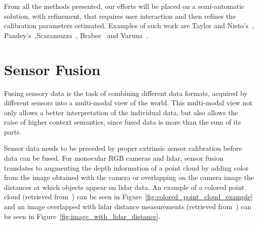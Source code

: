 From all the methods presented, our efforts will be placed on a semi-automatic solution, with refinement, that requires user interaction and then refines the calibration parameters estimated. Examples of such work are Taylor and Nieto's~\cite{Taylor2013}, Pandey's~\cite{Pandey2012},Scaramuzza~\cite{Scaramuzza}, Brabec~\cite{brabec2014} and Varuna~\cite{Silva2018}.


\section{Sensor Fusion}
\label{sec:sota:sensor-fusion}
Fusing sensory data is the task of combining different data formats, acquired by different sensors into a multi-modal view of the world. This multi-modal view not only allows a better interpretation of the individual data, but also allows the raise of higher context semantics, since fused data is more than the sum of its parts.

Sensor data needs to be preceded by proper extrinsic sensor calibration before data can be fused. For monocular RGB cameras and \ac{lidar}, sensor fusion translates to augmenting the depth information of a point cloud by adding color from the image obtained with the camera or overlapping on the camera image the distances at which objects appear on \ac{lidar} data. An example of a colored point cloud (retrieved from~\cite{Gong2013}) can be seen in Figure~\ref{fig:colored_point_cloud_example} and an image overlapped with \ac{lidar} distance measurements (retrieved from~\cite{Bileschi2009}) can be seen in Figure~\ref{fig:image_with_lidar_distance}.


